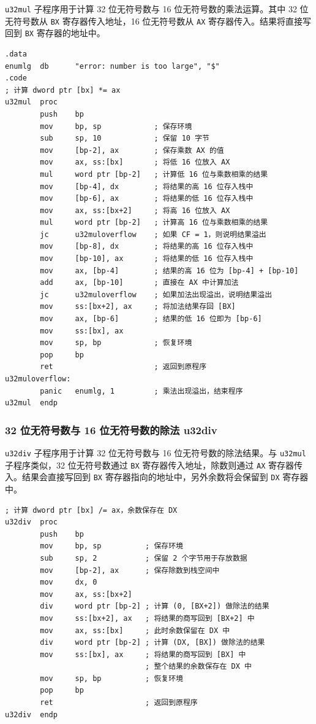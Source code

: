 \verb|u32mul| 子程序用于计算 32 位无符号数与 16 位无符号数的乘法运算。其中 32 位无符号数从 \verb|BX| 寄存器传入地址，16 位无符号数从 \verb|AX| 寄存器传入。结果将直接写回到 \verb|BX| 寄存器的地址中。

\begin{lstlisting}[language={[x86masm]Assembler},morekeywords={}]
.data
enumlg  db      "error: number is too large", "$"
.code
; 计算 dword ptr [bx] *= ax
u32mul  proc
        push    bp
        mov     bp, sp            ; 保存环境
        sub     sp, 10            ; 保留 10 字节
        mov     [bp-2], ax        ; 保存乘数 AX 的值
        mov     ax, ss:[bx]       ; 将低 16 位放入 AX
        mul     word ptr [bp-2]   ; 计算低 16 位与乘数相乘的结果
        mov     [bp-4], dx        ; 将结果的高 16 位存入栈中
        mov     [bp-6], ax        ; 将结果的低 16 位存入栈中
        mov     ax, ss:[bx+2]     ; 将高 16 位放入 AX
        mul     word ptr [bp-2]   ; 计算高 16 位与乘数相乘的结果
        jc      u32muloverflow    ; 如果 CF = 1，则说明结果溢出
        mov     [bp-8], dx        ; 将结果的高 16 位存入栈中
        mov     [bp-10], ax       ; 将结果的低 16 位存入栈中
        mov     ax, [bp-4]        ; 结果的高 16 位为 [bp-4] + [bp-10]
        add     ax, [bp-10]       ; 直接在 AX 中计算加法
        jc      u32muloverflow    ; 如果加法出现溢出，说明结果溢出
        mov     ss:[bx+2], ax     ; 将加法结果存回 [BX]
        mov     ax, [bp-6]        ; 结果的低 16 位即为 [bp-6]
        mov     ss:[bx], ax
        mov     sp, bp            ; 恢复环境
        pop     bp
        ret                       ; 返回到原程序
u32muloverflow:
        panic   enumlg, 1         ; 乘法出现溢出，结束程序
u32mul  endp
\end{lstlisting}

\subsubsection{32 位无符号数与 16 位无符号数的除法 u32div}

\verb|u32div| 子程序用于计算 32 位无符号数与 16 位无符号数的除法结果。与 \verb|u32mul| 子程序类似，32 位无符号数通过 \verb|BX| 寄存器传入地址，除数则通过 \verb|AX| 寄存器传入。结果会直接写回到 \verb|BX| 寄存器指向的地址中，另外余数将会保留到 \verb|DX| 寄存器中。

\begin{lstlisting}[language={[x86masm]Assembler},morekeywords={}]
; 计算 dword ptr [bx] /= ax，余数保存在 DX
u32div  proc
        push    bp
        mov     bp, sp          ; 保存环境
        sub     sp, 2           ; 保留 2 个字节用于存放数据
        mov     [bp-2], ax      ; 保存除数到栈空间中
        mov     dx, 0
        mov     ax, ss:[bx+2]
        div     word ptr [bp-2] ; 计算 (0, [BX+2]) 做除法的结果
        mov     ss:[bx+2], ax   ; 将结果的商写回到 [BX+2] 中
        mov     ax, ss:[bx]     ; 此时余数保留在 DX 中
        div     word ptr [bp-2] ; 计算 (DX, [BX]) 做除法的结果
        mov     ss:[bx], ax     ; 将结果的商写回到 [BX] 中
                                ; 整个结果的余数保存在 DX 中
        mov     sp, bp          ; 恢复环境
        pop     bp
        ret                     ; 返回到原程序
u32div  endp
\end{lstlisting}

